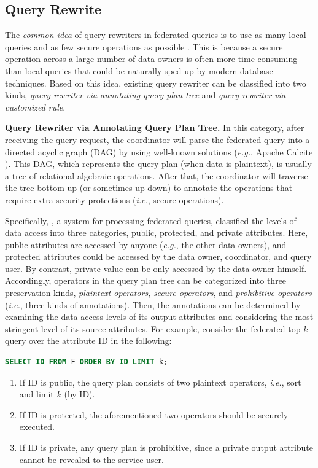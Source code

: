 \documentclass[11pt]{article}
\newcommand{\eg}{\textit{e.g.},\xspace}
\newcommand{\ie}{\textit{i.e.},\xspace}
\newcommand{\fakeparagraph}[1]{\vspace{1mm}\noindent\textbf{#1.}}
\begin{document}
\subsection{Query Rewrite}\label{sec:data-rewrite}

The \textit{common idea} of query rewriters in federated queries is to use as many local queries and as few secure operations as possible \cite{Yongxin-ref_tong2022hu}.
This is because a secure operation across a large number of data owners is often more time-consuming than local queries that could be naturally sped up by modern database techniques.
Based on this idea, existing query rewriter can be classified into two kinds, \textit{query rewriter via annotating query plan tree} and \textit{query rewriter via customized rule}.

\fakeparagraph{Query Rewriter via Annotating Query Plan Tree}
In this category, after receiving the query request, the coordinator will parse the federated query into a directed acyclic graph (DAG) by using well-known solutions (\eg Apache Calcite \cite{Yongxin-DBLP:conf/sigmod/BegoliCHML18}).
This DAG, which represents the query plan (when data is plaintext), is usually a tree of relational algebraic operations.
After that, the coordinator will traverse the tree bottom-up (or sometimes up-down) to annotate the operations that require extra security protections (\ie secure operations).

Specifically, \SMCQL \cite{Yongxin-ref_bater2017smcql}, a system for processing federated queries, classified the levels of data access into three categories, public, protected, and private attributes.
Here, public attributes are accessed by anyone (\eg the other data owners), and protected attributes could be accessed by the data owner, coordinator, and query user.
By contrast, private value can be only accessed by the data owner himself.
Accordingly, operators in the query plan tree can be categorized into three preservation kinds, \textit{plaintext operators}, \textit{secure operators}, and \textit{prohibitive operators} (\ie three kinds of annotations).
Then, the annotations can be determined by examining the data access levels of its output attributes and considering the most stringent level of its source attributes.
For example, consider the federated top-$k$ query over the attribute ID in the following:
\begin{lstlisting}[language=SQL]
  SELECT ID FROM F ORDER BY ID LIMIT k;
\end{lstlisting}
\begin{enumerate}[label=(\roman*)]
	\item If ID is public, the query plan consists of two plaintext operators, \ie sort and limit $k$ (by ID).
	\item If ID is protected, the aforementioned two operators should be securely executed.
	\item If ID is private, any query plan is prohibitive, since a private output attribute cannot be revealed to the service user.
\end{enumerate}
\end{document}
